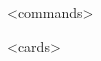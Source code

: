 \documentclass[a4paper,parskip]{scrartcl}
\begin{document}
\def\SymbReg{\textsuperscript{\textregistered}}
\setlength{\parskip}{-1pt}
\setlength{\lineskip}{0pt}

\centering

<commands>

<cards>

\makeCardLists
\end{document}
